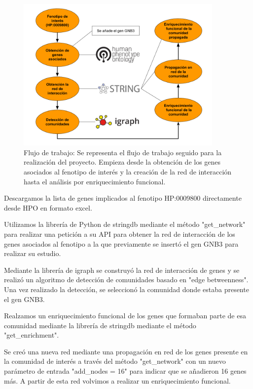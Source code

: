\begin{figure}[h!]
	\includegraphics[width=0.9\textwidth]{figures/workflow.png}
	\caption{Flujo de trabajo: Se representa el flujo de trabajo seguido para la realización del proyecto. Empieza desde la obtención de los genes asociados al fenotipo de interés y la creación de la red de interacción hasta el análisis por enriquecimiento funcional.}
	\label{fig:workflow}
\end{figure}

Descargamos la lista de genes implicados al fenotipo HP:0009800 directamente desde HPO en formato excel.

Utilizamos la librería de Python de stringdb mediante el método "get\_network" para realizar una petición a su API para obtener la red de interacción de los genes asociados al fenotipo a la que previamente se insertó el gen GNB3 para realizar su estudio.

Mediante la librería de igraph se construyó la red de interacción de genes y se realizó un algoritmo de detección de comunidades basado en "edge betweenness". Una vez realizado la detección, se seleccionó la comunidad donde estaba presente el gen GNB3.

Realzamos un enriquecimiento funcional de los genes que formaban parte de esa comunidad mediante la librería de stringdb mediante el método "get\_enrichment". 

Se creó una nueva red mediante una propagación en red de los genes presente en la comunidad de interés a través del método "get\_network" con un nuevo parámetro de entrada "add\_nodes = 16" para indicar que se añadieron 16 genes más. A partir de esta red volvimos a realizar un enriquecimiento funcional.
